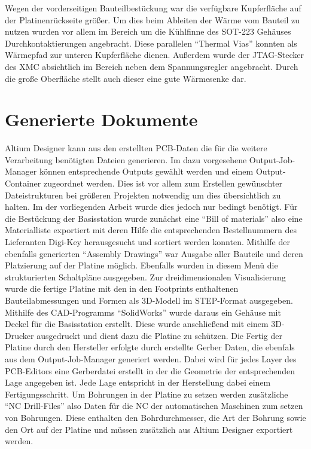 Wegen der vorderseitigen Bauteilbestückung war die verfügbare Kupferfläche auf der Platinenrückseite  größer. Um dies beim Ableiten der Wärme vom Bauteil zu nutzen wurden vor allem im Bereich um die Kühlfinne des \ac{SOT}-223 Gehäuses Durchkontaktierungen angebracht. Diese parallelen \enquote{Thermal Vias} konnten als Wärmepfad zur unteren Kupferfläche dienen. Außerdem wurde der \ac{JTAG}-Stecker des XMC absichtlich im Bereich neben dem Spannungsregler angebracht. Durch die große Oberfläche stellt auch dieser eine gute Wärmesenke dar. %

\section{Generierte Dokumente}
Altium Designer kann aus den erstellten \ac{PCB}-Daten die für die weitere Verarbeitung benötigten Dateien generieren. Im dazu vorgesehene Output-Job-Manager können entsprechende Outputs gewählt werden und einem Output-Container zugeordnet werden. Dies ist vor allem zum Erstellen gewünschter Dateistrukturen bei größeren Projekten notwendig um dies übersichtlich zu halten. Im der vorliegenden Arbeit wurde dies jedoch nur bedingt benötigt.
Für die Bestückung der Basisstation wurde zunächst eine \enquote{Bill of materials} also eine Materialliste exportiert mit deren Hilfe die entsprechenden Bestellnummern des Lieferanten Digi-Key herausgesucht und sortiert werden konnten. Mithilfe der ebenfalls generierten \enquote{Assembly Drawings} war Ausgabe aller Bauteile und deren Platzierung auf der Platine möglich. Ebenfalls wurden in diesem Menü die strukturierten Schaltpläne ausgegeben.
Zur dreidimensionalen Visualisierung wurde die fertige Platine mit den in den Footprints enthaltenen Bauteilabmessungen und Formen als 3D-Modell im \ac{STEP}-Format ausgegeben. Mithilfe des \ac{CAD}-Programms \enquote{SolidWorks} wurde daraus ein Gehäuse mit Deckel für die Basisstation erstellt. Diese wurde anschließend mit einem 3D-Drucker ausgedruckt und dient dazu die Platine zu schützen.
Die Fertig der Platine durch den Hersteller erfolgte durch erstellte Gerber Daten, die ebenfals aus dem Output-Job-Manager generiert werden. Dabei wird für jedes Layer des \ac{PCB}-Editors eine Gerberdatei erstellt in der die Geometrie der entsprechenden Lage angegeben ist. Jede Lage entspricht in der Herstellung dabei einem Fertigungsschritt. Um Bohrungen in der Platine zu setzen werden zusätzliche \enquote{NC Drill-Files} also Daten für die \ac{NC} der automatischen Maschinen zum setzen von Bohrungen. Diese enthalten den Bohrdurchmesser, die Art der Bohrung sowie den Ort auf der Platine und müssen zusätzlich aus Altium Designer exportiert werden.